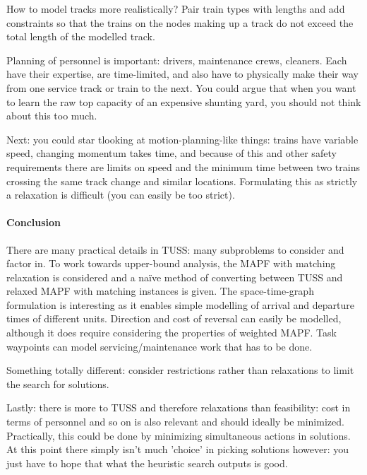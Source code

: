 \documentclass[a4paper,10pt,english]{article}
\begin{document}
	 How to model tracks more realistically? Pair train types with lengths and add constraints so that the trains on the nodes making up a track do not exceed the total length of the modelled track.
	 
	 Planning of personnel is important: drivers, maintenance crews, cleaners. Each have their expertise, are time-limited, and also have to physically make their way from one service track or train to the next. You could argue that when you want to learn the raw top capacity of an expensive shunting yard, you should not think about this too much. 
	 
	 Next: you could star tlooking at motion-planning-like things: trains have variable speed, changing momentum takes time, and because of this and other safety requirements there are limits on speed and the minimum time between two trains crossing the same track change and similar locations. Formulating this as strictly a relaxation is difficult (you can easily be too strict).
	
	 
	 \paragraph{Conclusion}
	 There are many practical details in TUSS: many subproblems to consider and factor in. To work towards upper-bound analysis, the MAPF with matching relaxation is considered and a naïve method of converting between TUSS and relaxed MAPF with matching instances is given. The space-time-graph formulation is interesting as it enables simple modelling of arrival and departure times of different units. Direction and cost of reversal can easily be modelled, although it does require considering the properties of weighted MAPF. Task waypoints can model servicing/maintenance work that has to be done.
	 
	 Something totally different: consider restrictions rather than relaxations to limit the search for solutions.
	 
	 Lastly: there is more to TUSS and therefore relaxations than feasibility: cost in terms of personnel and so on is also relevant and should ideally be minimized. Practically, this could be done by minimizing simultaneous actions in solutions. At this point there simply isn't much 'choice' in picking solutions however: you just have to hope that what the heuristic search outputs is good.
	\printbibliography
	
\end{document}
